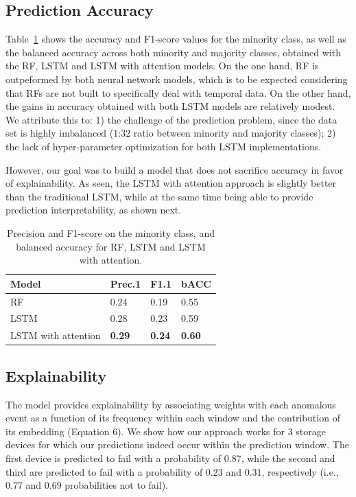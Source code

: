 \documentclass[letterpaper]{article} %
\begin{document}
\subsection{Prediction Accuracy}

Table~\ref{accuracy} shows the accuracy and F1-score values for the minority class, as well as the balanced accuracy across both minority and majority classes, obtained with the RF, LSTM and LSTM with attention models. On the one hand, RF is outpeformed by both neural network models, which is to be expected considering that RFs are not built to specifically deal with temporal data. On the other hand, the gains in accuracy obtained with both LSTM models are relatively modest. We attribute this to: 1) the challenge of the prediction problem, since the data set is highly imbalanced (1:32 ratio between minority and majority classes); 2) the lack of hyper-parameter optimization for both LSTM implementations.

However, our goal was to build a model that does not sacrifice accuracy in favor of explainability. As seen, the LSTM with attention approach is slightly better than the traditional LSTM, while at the same time being able to provide prediction interpretability, as shown next.


\begin{table}
\centering
\begin{tabular}{| l | l | l | l |}
\hline
\textbf{Model} & \textbf{Prec.1} & \textbf{F1.1} & \textbf{bACC} \\
\hline
RF & 0.24 & 0.19 & 0.55 \\
\hline
LSTM & 0.28 &   0.23 & 0.59\\
\hline
LSTM with attention & \textbf{0.29} & \textbf{0.24} & \textbf{0.60} \\
\hline
\end{tabular}
\caption{Precision and F1-score on the minority class, and balanced accuracy for RF, LSTM and LSTM with attention.}
\label{accuracy}
\end{table}

\subsection{Explainability}
The model provides explainability by associating weights with each anomalous event as a function of its frequency within each window and the contribution of its embedding (Equation 6). We show how our approach works for 3 storage devices for which our predictions indeed occur within the prediction window. The first device is predicted to fail with a probability of 0.87, while the second and third are predicted to fail with a probability of 0.23 and 0.31, respectively (i.e., 0.77 and 0.69 probabilities not to fail).
\end{document}
